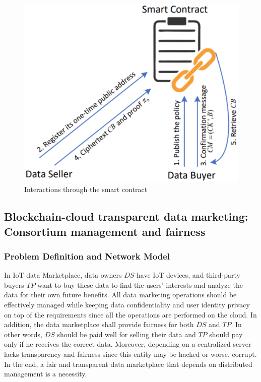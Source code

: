 \begin{figure}
\centering
  \includegraphics[width=0.8\linewidth]{imgs/23-interactions.eps}
  \caption{Interactions through the smart contract~\cite{xue2023blockchain}}
  \label{fig:23-interactions-through-smart-contract}
\end{figure}

\subsection{Blockchain-cloud transparent data marketing: Consortium management and fairness~\cite{liu2022blockchain}}
\label{sec:blockchain-cloud-trasparent-data-marketing-consortium-management}

\subsubsection{Problem Definition and Network Model}
In IoT data Marketplace, data owners $DS$ have IoT devices, and third-party buyers $TP$ want to buy these data to find the users’ interests and analyze the data for their own future benefits.
All data marketing operations should be effectively managed while keeping data confidentiality and user identity privacy on top of the requirements since all the operations are performed on the cloud.
In addition, the data marketplace shall provide fairness for both $DS$ and $TP$.
In other words, $DS$ should be paid well for selling their data and $TP$ should pay only if he receives the correct data.
Moreover, depending on a centralized server lacks transparency and fairness since this entity may be hacked or worse, corrupt.
In the end, a fair and transparent data marketplace that depends on distributed management is a necessity.

